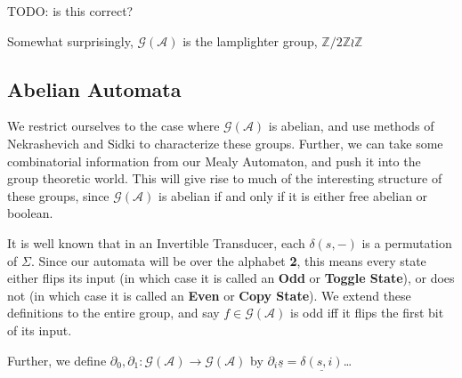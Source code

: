 \documentclass[12pt]{article}
\newcommand{\A}{\mathcal{A}}
\newcommand{\G}{\mathcal{G}}
\newcommand{\Z}{\mathbb{Z}}
\newcommand{\2}{\textbf{2}}
\newcommand{\del}{\partial}
\begin{document}
TODO: is this correct?

\begin{center}
\end{center}

Somewhat surprisingly, $\G(\A)$ is the lamplighter group, $\Z/2\Z \wr \Z$

\subsection{Abelian Automata}
We restrict ourselves to the case where $\G(\A)$ is abelian, 
and use methods of Nekrashevich and Sidki to characterize these groups.
Further, we can take some combinatorial information from our Mealy 
Automaton, and push it into the group theoretic world. This will give
rise to much of the interesting structure of these groups, since
$\G(\A)$ is abelian if and only if it is either free abelian or 
boolean.

It is well known that in an Invertible Transducer, each $\delta(s,-)$
is a permutation of $\Sigma$. Since our automata will be over the alphabet
\2, this means every state either flips its input 
(in which case it is called an \textbf{Odd} or \textbf{Toggle State}), 
or does not
(in which case it is called an \textbf{Even} or \textbf{Copy State}).
We extend these definitions to the entire group, and say $f \in \G(\A)$ 
is odd iff it flips the first bit of its input.

Further, we define $\del_0, \del_1 : \G(\A) \to \G(\A)$ by 
$\del_i \underline{s} = \underline{\delta(s,i)}$\ldots
\end{document}
